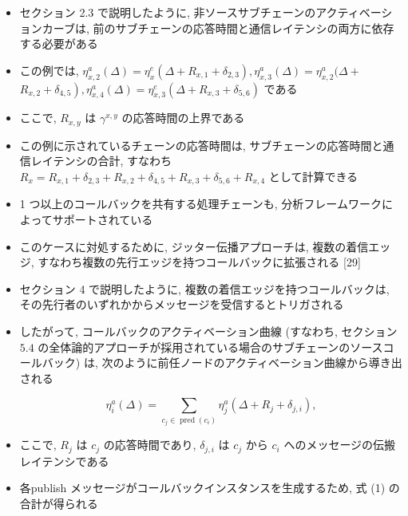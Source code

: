 \begin{frame}{}
    \begin{itemize}
        \item セクション 2.3 で説明したように, 非ソースサブチェーンのアクティベーションカーブは, 前のサブチェーンの応答時間と通信レイテンシの両方に依存する必要がある
        \item この例では, $\eta_{x, 2}^{a}(\Delta)=\eta_{x}^{e}\left(\Delta+R_{x, 1}+\delta_{2,3}\right), \eta_{x, 3}^{a}(\Delta)=\eta_{x, 2}^{a}(\Delta+$  $\left.R_{x, 2}+\delta_{4,5}\right), \eta_{x, 4}^{a}(\Delta)=\eta_{x, 3}^{e}\left(\Delta+R_{x, 3}+\delta_{5,6}\right)$ である
        \item ここで, $R_{x, y}$ は $\gamma^{x, y}$ の応答時間の上界である
        \item この例に示されているチェーンの応答時間は, サブチェーンの応答時間と通信レイテンシの合計, すなわち $R_{x}=R_{x, 1}+\delta_{2,3}+R_{x, 2}+\delta_{4,5}+R_{x, 3}+\delta_{5,6}+R_{x, 4}$ として計算できる
    \end{itemize}
\end{frame}

\begin{frame}{}
    \begin{itemize}
        \item 1 つ以上のコールバックを共有する処理チェーンも, 分析フレームワークによってサポートされている
        \item このケースに対処するために, ジッター伝播アプローチは, 複数の着信エッジ, すなわち複数の先行エッジを持つコールバックに拡張される [29]
        \item セクション 4 で説明したように, 複数の着信エッジを持つコールバックは, その先行者のいずれかからメッセージを受信するとトリガされる
    \end{itemize}
\end{frame}

\begin{frame}{}
    \begin{itemize}
        \item したがって, コールバックのアクティベーション曲線 (すなわち, セクション $5.4$ の全体論的アプローチが採用されている場合のサブチェーンのソースコールバック) は, 次のように前任ノードのアクティベーション曲線から導き出される

              \begin{equation*}
                  \eta_{i}^{a}(\Delta)=\sum_{c_{j} \in \operatorname{pred}\left(c_{i}\right)} \eta_{j}^{a}\left(\Delta+R_{j}+\delta_{j, i}\right),
              \end{equation*}

        \item ここで, $R_{j}$ は $c_{j}$ の応答時間であり, $\delta_{j, i}$ は $c_{j}$ から $c_{i}$ へのメッセージの伝搬レイテンシである
        \item 各publish メッセージがコールバックインスタンスを生成するため, 式 (1) の合計が得られる
    \end{itemize}
\end{frame}


